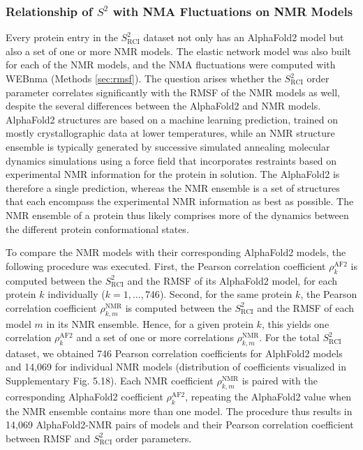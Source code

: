 \subsubsection{Relationship of $S^2$ with NMA Fluctuations on NMR Models} \label{section:plddt:s2_nma_nmr}

Every protein entry in the $S^2_{\text{RCI}}$ dataset not only has an AlphaFold2 model but also a set of one or more NMR models. The elastic network model was also built for each of the NMR models, and the NMA fluctuations were computed with WEBnma (Methods \ref{sec:rmsf}).
The question arises whether the $S^2_{\text{RCI}}$ order parameter correlates significantly with the RMSF of the NMR models as well,
despite the several differences between the AlphaFold2 and NMR models. AlphaFold2 structures are based on a machine learning prediction, trained on mostly crystallographic data at lower temperatures, while an NMR structure ensemble is typically generated by successive simulated annealing molecular dynamics simulations using a force field that incorporates restraints based on experimental NMR information for the protein in solution. The AlphaFold2 is therefore a single prediction, whereas the NMR ensemble is a set of structures that each encompass the experimental NMR information as best as possible. The NMR ensemble of a protein thus likely comprises more of the dynamics between the different protein conformational states. 

To compare the NMR models with their corresponding AlphaFold2 models, the following procedure was executed. First, the Pearson correlation coefficient $\rho_k^{\text{AF2}}$ is computed between the $S^{2}_{\text{RCI}}$ and the RMSF of its AlphaFold2 model, for each protein $k$ individually ($k=1,\dots,746$). 
Second, for the same protein $k$, the Pearson correlation coefficient $\rho_{k,m}^{\text{NMR}}$ is computed between the $S^2_{\text{RCI}}$ and the RMSF of each model $m$ in its NMR ensemble. 
Hence, for a given protein $k$, this yields one correlation $\rho_k^{\text{AF2}}$ and a set of one or more correlations $\rho_{k,m}^{\text{NMR}}$.
For the total $S^2_{\text{RCI}}$ dataset, we obtained 746 Pearson correlation coefficients for AlphFold2 models and 14,069 for individual NMR models (distribution of coefficients visualized in Supplementary Fig. 5.18).
Each NMR coefficient $\rho_{k,m}^{\text{NMR}}$ is paired with the corresponding AlphaFold2 coefficient $\rho_k^{\text{AF2}}$, repeating the AlphaFold2 value when the NMR ensemble contains more than one model. The procedure thus results in 14,069 AlphaFold2-NMR pairs of models and their Pearson correlation coefficient between RMSF and $S^2_{\text{RCI}}$ order parameters.

